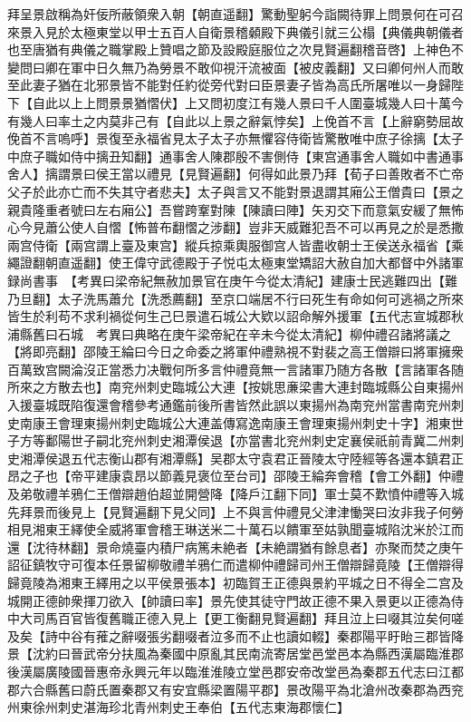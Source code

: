 拜呈景啟稱為奸佞所蔽領衆入朝【朝直遥翻】驚動聖躬今詣闕待罪上問景何在可召來景入見於太極東堂以甲士五百人自衛景稽顙殿下典儀引就三公榻【典儀典朝儀者也至唐猶有典儀之職掌殿上贊唱之節及設殿庭服位之次見賢遍翻稽音啓】上神色不變問曰卿在軍中日久無乃為勞景不敢仰視汗流被面【被皮義翻】又曰卿何州人而敢至此妻子猶在北邪景皆不能對任約從旁代對曰臣景妻子皆為高氏所屠唯以一身歸陛下【自此以上上問景景猶慴伏】上又問初度江有幾人景曰千人圍臺城幾人曰十萬今有幾人曰率土之内莫非己有【自此以上景之辭氣悖矣】上俛首不言【上辭窮勢屈故俛首不言嗚呼】景復至永福省見太子太子亦無懼容侍衛皆驚散唯中庶子徐摛【太子中庶子職如侍中摛丑知翻】通事舍人陳郡殷不害側侍【東宫通事舍人職如中書通事舍人】摛謂景曰侯王當以禮見【見賢遍翻】何得如此景乃拜【荀子曰善敗者不亡帝父子於此亦亡而不失其守者悲夫】太子與言又不能對景退謂其廂公王僧貴曰【景之親貴隆重者號曰左右廂公】吾嘗跨鞌對陳【陳讀曰陣】矢刃交下而意氣安緩了無怖心今見蕭公使人自慴【怖普布翻慴之涉翻】豈非天威難犯吾不可以再見之於是悉撒兩宫侍衛【兩宫謂上臺及東宫】縱兵掠乘輿服御宫人皆盡收朝士王侯送永福省【乘繩證翻朝直遥翻】使王偉守武德殿于子悦屯太極東堂矯詔大赦自加大都督中外諸軍録尚書事　【考異曰梁帝紀無赦加景官在庚午今從太清紀】建康士民逃難四出【難乃旦翻】太子洗馬蕭允【洗悉薦翻】至京口端居不行曰死生有命如何可逃禍之所來皆生於利苟不求利禍從何生己巳景遣石城公大欵以詔命解外援軍【五代志宣城郡秋浦縣舊曰石城　考異曰典略在庚午梁帝紀在辛未今從太清紀】柳仲禮召諸將議之【將即亮翻】邵陵王綸曰今日之命委之將軍仲禮熟視不對裴之高王僧辯曰將軍擁衆百萬致宫闕淪沒正當悉力决戰何所多言仲禮竟無一言諸軍乃随方各散【言諸軍各随所來之方散去也】南兖州刺史臨城公大連【按姚思亷梁書大連封臨城縣公自東揚州入援臺城既陷復還會稽參考通鑑前後所書皆然此誤以東揚州為南兖州當書南兖州刺史南康王會理東揚州刺史臨城公大連盖傳寫逸南康王會理東揚州刺史十字】湘東世子方等鄱陽世子嗣北兖州刺史湘潭侯退【亦當書北兖州刺史定襄侯祇前青冀二州刺史湘潭侯退五代志衡山郡有湘潭縣】吴郡太守袁君正晉陵太守陸經等各還本鎮君正昂之子也【帝平建康袁昂以節義見褒位至台司】邵陵王綸奔會稽【會工外翻】仲禮及弟敬禮羊鴉仁王僧辯趙伯超並開營降【降戶江翻下同】軍士莫不歎憤仲禮等入城先拜景而後見上【見賢遍翻下見父同】上不與言仲禮見父津津慟哭曰汝非我子何勞相見湘東王繹使全威將軍會稽王琳送米二十萬石以饋軍至姑孰聞臺城陷沈米於江而還【沈待林翻】景命燒臺内積尸病篤未絶者【未絶謂猶有餘息者】亦聚而焚之庚午詔征鎮牧守可復本任景留柳敬禮羊鴉仁而遣柳仲禮歸司州王僧辯歸竟陵【王僧辯得歸竟陵為湘東王繹用之以平侯景張本】初臨賀王正德與景約平城之日不得全二宫及城開正德帥衆揮刀欲入【帥讀曰率】景先使其徒守門故正德不果入景更以正德為侍中大司馬百官皆復舊職正德入見上【更工衡翻見賢遍翻】拜且泣上曰啜其泣矣何嗟及矣【詩中谷有蓷之辭啜張劣翻啜者泣多而不止也讀如輟】秦郡陽平盱眙三郡皆降景【沈約曰晉武帝分扶風為秦國中原亂其民南流寄居堂邑堂邑本為縣西漢屬臨淮郡後漢屬廣陵國晉惠帝永興元年以臨淮淮陵立堂邑郡安帝改堂邑為秦郡五代志曰江都郡六合縣舊曰蔚氏置秦郡又有安宜縣梁置陽平郡】景改陽平為北滄州改秦郡為西兖州東徐州刺史湛海珍北青州刺史王奉伯【五代志東海郡懷仁】

